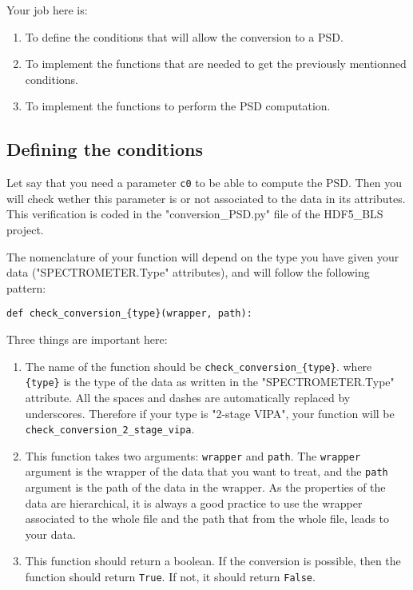 \documentclass[a4paper,12pt]{article}
\begin{document}
Your job here is:
\begin{enumerate}
    \item To define the conditions that will allow the conversion to a PSD.
    \item To implement the functions that are needed to get the previously mentionned conditions.
    \item To implement the functions to perform the PSD computation.
\end{enumerate}

\subsection{Defining the conditions}

Let say that you need a parameter \texttt{c0} to be able to compute the PSD. Then you will check wether this parameter is or not associated to the data in its attributes. This verification is coded in the "conversion\_PSD.py" file of the HDF5\_BLS project. 

The nomenclature of your function will depend on the type you have given your data ("SPECTROMETER.Type" attributes), and will follow the following pattern:
\begin{verbatim}
def check_conversion_{type}(wrapper, path):
\end{verbatim}

Three things are important here:
\begin{enumerate}
    \item The name of the function should be \texttt{check\_conversion\_\{type\}}. where \texttt{\{type\}} is the type of the data as written in the "SPECTROMETER.Type" attribute. All the spaces and dashes are automatically replaced by underscores. Therefore if your type is "2-stage VIPA", your function will be \texttt{check\_conversion\_2\_stage\_vipa}.
    \item This function takes two arguments: \texttt{wrapper} and \texttt{path}. The \texttt{wrapper} argument is the wrapper of the data that you want to treat, and the \texttt{path} argument is the path of the data in the wrapper. As the properties of the data are hierarchical, it is always a good practice to use the wrapper associated to the whole file and the path that from the whole file, leads to your data.
    \item This function should return a boolean. If the conversion is possible, then the function should return \texttt{True}. If not, it should return \texttt{False}.
\end{enumerate}
\end{document}
